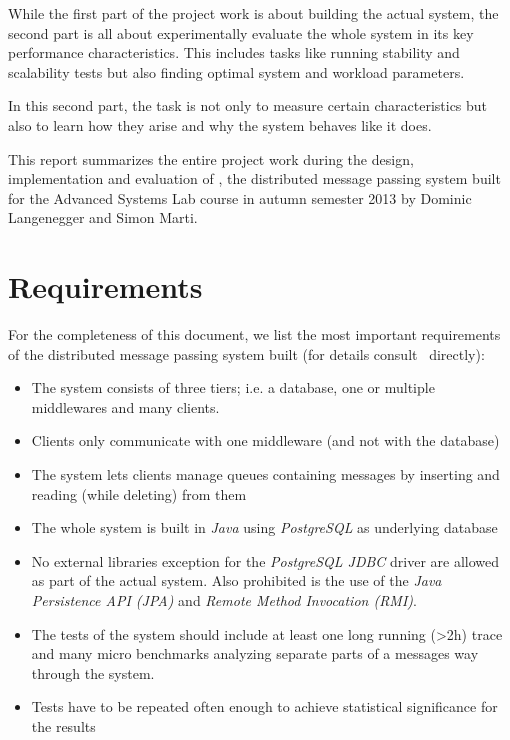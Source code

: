 \documentclass[a4paper, oneside]{csthesis}
\begin{document}
	While the first part of the project work is about building the actual
	system, the second part is all about experimentally evaluate the whole system
	in its key performance characteristics. This includes tasks like running
	stability and scalability tests but also finding optimal system and workload
	parameters.
	
    In this second part, the task is not only to measure certain characteristics but
    also to learn how they arise and why the system behaves like it does.
	
	This report summarizes the entire project work during the design,
	implementation and evaluation of \telesto, the distributed message passing
	system built for the Advanced Systems Lab course in autumn semester 2013 by
	Dominic Langenegger and Simon Marti.
	
	
\section{Requirements}
    For the completeness of this document, we list the most important
    requirements of the distributed message passing system built (for details
    consult~\cite{asl:course-description} directly):
    
    \begin{itemize}
        \item The system consists of three tiers; i.e. a database, one or
        multiple middlewares and many clients.
        \item Clients only communicate with one middleware (and not with the
        database)
        \item The system lets clients manage queues containing messages by
        inserting and reading (while deleting) from them
        \item The whole system is built in {\it Java} using {\it PostgreSQL} as
        underlying database
        \item No external libraries exception for the {\it PostgreSQL JDBC}
        driver are allowed as part of the actual system. Also prohibited is the
        use of the {\it Java Persistence API (JPA)} and {\it Remote Method
        Invocation (RMI)}.
        \item The tests of the system should include at least one long running
        (\textgreater 2h) trace and many micro benchmarks analyzing separate
        parts of a messages way through the system. 
        \item Tests have to be repeated often enough to achieve statistical
        significance for the results
    \end{itemize}
\end{document}
